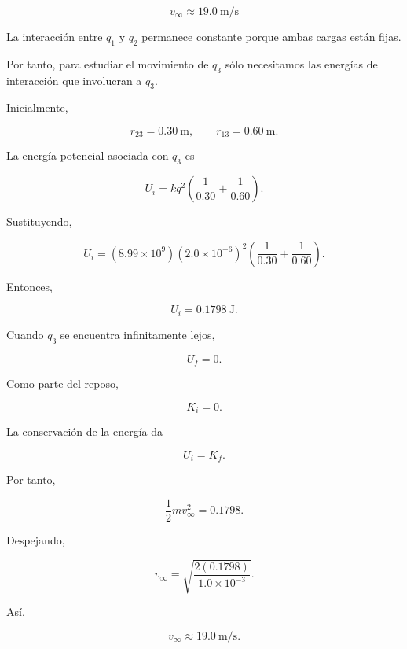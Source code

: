 \begin{respuesta}

\[
\boxed{v_\infty\approx\SI{19.0}{\metre\per\second}}
\]

\end{respuesta}

\begin{explicacion}

La interacción entre \(q_1\) y \(q_2\) permanece constante porque ambas cargas están
fijas.

Por tanto, para estudiar el movimiento de \(q_3\) sólo necesitamos las energías de
interacción que involucran a \(q_3\).

Inicialmente,

\[
r_{23}=\SI{0.30}{\metre},
\qquad
r_{13}=\SI{0.60}{\metre}.
\]

La energía potencial asociada con \(q_3\) es

\[
U_i
=
kq^2
\left(
\frac{1}{0.30}
+
\frac{1}{0.60}
\right).
\]

Sustituyendo,

\[
U_i
=
(8.99\times10^9)(2.0\times10^{-6})^2
\left(
\frac{1}{0.30}
+
\frac{1}{0.60}
\right).
\]

Entonces,

\[
U_i=\SI{0.1798}{\joule}.
\]

Cuando \(q_3\) se encuentra infinitamente lejos,

\[
U_f=0.
\]

Como parte del reposo,

\[
K_i=0.
\]

La conservación de la energía da

\[
U_i=K_f.
\]

Por tanto,

\[
\frac12mv_\infty^2
=
0.1798.
\]

Despejando,

\[
v_\infty
=
\sqrt{\frac{2(0.1798)}{1.0\times10^{-3}}}.
\]

Así,

\[
\boxed{v_\infty\approx\SI{19.0}{\metre\per\second}}.
\]

\end{explicacion}


